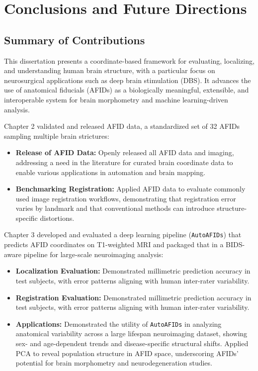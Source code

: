 \chapter{Conclusions and Future Directions}
\newpage
\sloppy
\section{Summary of Contributions}
This dissertation presents a coordinate-based framework for evaluating, localizing, and understanding human brain structure, with a particular focus on neurosurgical applications such as deep brain stimulation (DBS). It advances the use of anatomical fiducials (AFIDs) as a biologically meaningful, extensible, and interoperable system for brain morphometry and machine learning-driven analysis.

Chapter 2 validated and released AFID data, a standardized set of 32 AFIDs sampling multiple brain strictures:
\begin{itemize}
    \item \textbf{Release of AFID Data:} Openly released all AFID data and imaging, addressing a need in the literature for curated brain coordinate data to enable various applications in automation and brain mapping.
    \item \textbf{Benchmarking Registration:} Applied AFID data to evaluate commonly used image registration workflows, demonstrating that registration error varies by landmark and that conventional methods can introduce structure-specific distortions.
\end{itemize}

Chapter 3 developed and evaluated a deep learning pipeline (\texttt{AutoAFIDs}) that predicts AFID coordinates on T1-weighted MRI and packaged that in a BIDS-aware pipeline for large-scale neuroimaging analysis:
\begin{itemize}
    \item \textbf{Localization Evaluation:} Demonstrated millimetric prediction accuracy in test subjects, with error patterns aligning with human inter-rater variability.
    \item \textbf{Registration Evaluation:} Demonstrated millimetric prediction accuracy in test subjects, with error patterns aligning with human inter-rater variability.
    \item \textbf{Applications:} Demonstrated the utility of \texttt{AutoAFIDs} in analyzing anatomical variability across a large lifespan neuroimaging dataset, showing sex- and age-dependent trends and disease-specific structural shifts. Applied PCA to reveal population structure in AFID space, underscoring AFIDs’ potential for brain morphometry and neurodegeneration studies.
\end{itemize}

